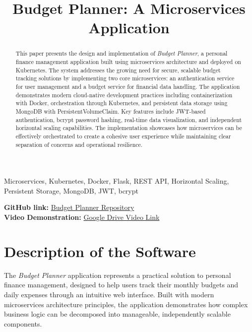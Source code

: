 \documentclass[conference]{IEEEtran}
\begin{document}
\title{Budget Planner: A Microservices Application}

\author{ %
} %

\maketitle

\begin{abstract}
This paper presents the design and implementation of \emph{Budget Planner}, a personal finance management application built using microservices architecture and deployed on Kubernetes. The system addresses the growing need for secure, scalable budget tracking solutions by implementing two core microservices: an authentication service for user management and a budget service for financial data handling. The application demonstrates modern cloud-native development practices including containerization with Docker, orchestration through Kubernetes, and persistent data storage using MongoDB with PersistentVolumeClaim. Key features include JWT-based authentication, bcrypt password hashing, real-time data visualization, and independent horizontal scaling capabilities. The implementation showcases how microservices can be effectively orchestrated to create a cohesive user experience while maintaining clear separation of concerns and operational resilience.
\end{abstract}

\begin{IEEEkeywords}
Microservices, Kubernetes, Docker, Flask, REST API, Horizontal Scaling, Persistent Storage, MongoDB, JWT, bcrypt
\end{IEEEkeywords}

\noindent\textbf{GitHub link: }
\href{https://github.com/md-d-cdr-4304/budget-planner}{Budget Planner Repository}\\
\noindent\textbf{Video Demonstration: }
\href{https://drive.google.com/drive/folders/1wueHDj2LGUJuBejR03_hyvfuyfl1XE6-?usp=sharing}{Google Drive Video Link}
\\[2mm]

\section{\textbf{Description of the Software}}
The \emph{Budget Planner} application represents a practical solution to personal finance management, designed to help users track their monthly budgets and daily expenses through an intuitive web interface. Built with modern microservices architecture principles, the application demonstrates how complex business logic can be decomposed into manageable, independently scalable components.
\end{document}
